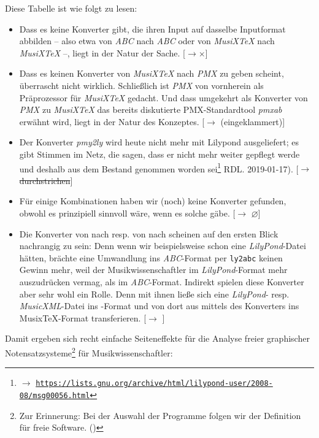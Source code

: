 Diese Tabelle ist wie folgt zu lesen:

\begin{itemize}
  \item Dass es keine Konverter gibt, die ihren Input auf dasselbe Inputformat
  abbilden -- also etwa von \textit{ABC} nach \textit{ABC} oder von
  \textit{MusiX\TeX} nach \textit{MusiX\-\TeX} --, liegt in der Natur der Sache.
  [$\rightarrow \times$] \item Dass es keinen Konverter von \textit{MusiX\TeX}
  nach \textit{PMX} zu geben scheint, überrascht nicht wirklich. Schließlich ist
  \textit{PMX} von vornherein als Präprozessor für \textit{MusiX\TeX} gedacht.
  Und dass umgekehrt als Konverter von \textit{PMX} zu \textit{MusiX\TeX} das
  bereits diskutierte PMX-Standardtool \textit{pmxab} erwähnt wird, liegt in der
  Natur des Konzeptes. [$\rightarrow$ (eingeklammert)]
  \item Der Konverter \textit{pmy2ly} wird heute nicht mehr mit Lilypond
  ausgeliefert; es gibt Stimmen im Netz, die sagen, dass er nicht mehr weiter
  gepflegt werde und deshalb aus dem Bestand genommen worden sei\footnote{$\rightarrow$
  \href{https://lists.gnu.org/archive/html/lilypond-user/2008-08/msg00056.html}{
  \texttt{https://lists.gnu.org/archive/html/lilypond-user/2008-08/msg00056.html}}}
  RDL. 2019-01-17). [$\rightarrow$ \sout{durchstrichen}]
  \item Für einige Kombinationen haben wir (noch) keine Konverter gefunden,
  obwohl es prinzipiell sinnvoll wäre, wenn es solche gäbe. [$\rightarrow$
  $\varnothing$] 
  \item Die Konverter von  nach  resp. von 
  nach  scheinen auf den ersten Blick nachrangig zu sein: Denn wenn wir
  beispielsweise schon eine \textit{LilyPond}-Datei hätten, brächte eine
  Umwandlung ins \textit{ABC}-Format per \texttt{ly2abc} keinen Gewinn mehr,
  weil der Musikwissenschaftler im \textit{LilyPond}-Format mehr auszudrücken
  vermag, als im \textit{ABC}-Format. Indirekt spielen diese Konverter aber sehr
  wohl ein Rolle. Denn mit ihnen ließe sich eine \textit{LilyPond}- resp.
  \textit{MusicXML}-Datei ins -Format und von dort aus mittels des
  Konverters  ins Musix\TeX-Format transferieren.
  [$\rightarrow$ ]
\end{itemize}

Damit ergeben sich recht einfache Seiteneffekte für die Analyse freier
graphischer Notensatzsysteme\footnote{Zur Erinnerung: Bei der Auswahl der
Programme folgen wir der Definition für freie Software. (\cite[Vgl.
dazu][\nopage wp]{FSF2018a})} für Musikwissenschaftler:

